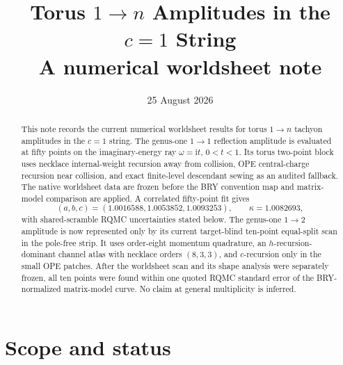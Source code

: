 \documentclass[11pt]{article}
\title{Torus \texorpdfstring{$1\to n$}{1 to n} Amplitudes in the
       \texorpdfstring{$c=1$}{c=1} String\\[0.4em]
       \large A numerical worldsheet note}
\author{}
\date{25 August 2026}
\newcommand{\ii}{\mathrm{i}}
\begin{document}
\maketitle

\begin{abstract}
This note records the current numerical worldsheet results for torus
$1\to n$ tachyon amplitudes in the $c=1$ string.  The genus-one $1\to1$
reflection amplitude is evaluated at fifty points on the imaginary-energy
ray $\omega=\ii t$, $0<t<1$.  Its torus two-point block uses necklace
internal-weight recursion away from collision, OPE central-charge recursion
near collision, and exact finite-level descendant sewing as an audited
fallback.  The native worldsheet data are frozen before the BRY convention
map and matrix-model comparison are applied.  A correlated fifty-point fit
gives
\begin{equation*}
 (a,b,c)=(1.0016588,1.0053852,1.0093253),
 \qquad \kappa=1.0082693,
\end{equation*}
with shared-scramble RQMC uncertainties stated below.  The genus-one
$1\to2$ amplitude is now represented only by its current target-blind
ten-point equal-split scan in the pole-free strip.  It uses order-eight
momentum quadrature, an $h$-recursion-dominant channel atlas with necklace
orders $(8,3,3)$, and $c$-recursion only in the small OPE patches.  After the
worldsheet scan and its shape analysis were separately frozen, all ten points
were found within one quoted RQMC standard error of the BRY-normalized
matrix-model curve.  No claim at general multiplicity is inferred.
\end{abstract}

\tableofcontents

\section{Scope and status}
\label{sec:scope}
\end{document}
